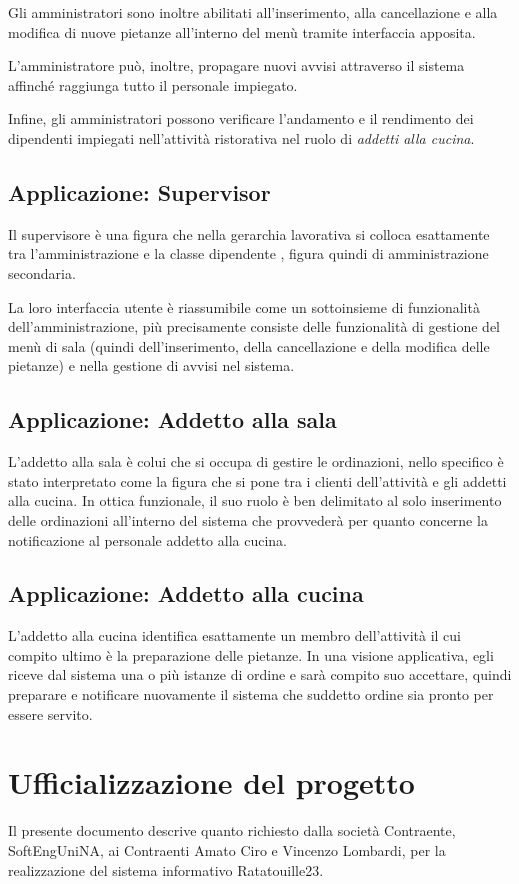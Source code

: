 Gli amministratori sono inoltre abilitati all'inserimento, alla cancellazione e alla modifica di nuove pietanze all'interno del menù tramite interfaccia apposita.

L'amministratore può, inoltre, propagare nuovi avvisi attraverso il sistema affinché raggiunga tutto il personale impiegato.

Infine, gli amministratori possono verificare l'andamento e il rendimento dei dipendenti impiegati nell'attività ristorativa nel ruolo di \textit{addetti alla cucina}.

\pagebreak
\subsection{Applicazione: Supervisor}
Il supervisore è una figura che nella gerarchia lavorativa si colloca esattamente tra l'amministrazione e la classe dipendente , figura quindi di amministrazione secondaria.

La loro interfaccia utente è riassumibile come un sottoinsieme di funzionalità dell'amministrazione, più precisamente consiste delle funzionalità di gestione del menù di sala (quindi dell'inserimento, della cancellazione e della modifica delle pietanze) e nella gestione di avvisi nel sistema.

\subsection{Applicazione: Addetto alla sala}
L'addetto alla sala è colui che si occupa di gestire le ordinazioni, nello specifico è stato interpretato come la figura che si pone tra i clienti dell'attività e gli addetti alla cucina. In ottica funzionale, il suo ruolo è ben delimitato al solo inserimento delle ordinazioni all'interno del sistema che provvederà per quanto concerne la notificazione al personale addetto alla cucina.

\subsection{Applicazione: Addetto alla cucina}
L'addetto alla cucina identifica esattamente un membro dell'attività il cui compito ultimo è la preparazione delle pietanze. In una visione applicativa, egli riceve dal sistema una o più istanze di ordine e sarà compito suo accettare, quindi preparare e notificare nuovamente il sistema che suddetto ordine sia pronto per essere servito.

\section{Ufficializzazione del progetto}
Il presente documento descrive quanto richiesto dalla società Contraente, SoftEngUniNA, ai Contraenti Amato Ciro e Vincenzo Lombardi, per la realizzazione del sistema informativo Ratatouille23.

